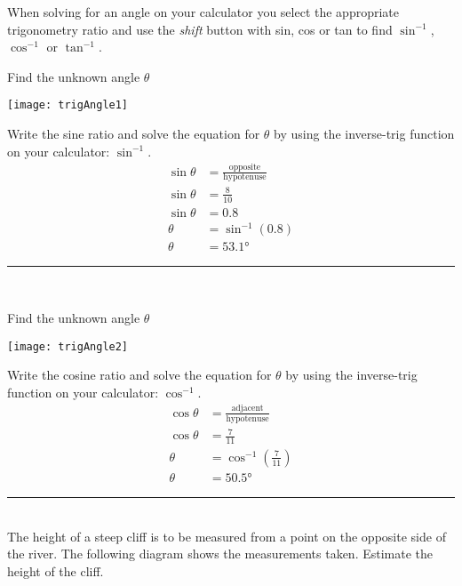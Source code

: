 When solving for an angle on your calculator you select the appropriate trigonometry ratio and use the \emph{shift} button with sin, cos or tan to find $\sin ^{ -1}$, $\cos ^{ -1}$ or $\tan ^{ -1}$. 
\begin{multicols}{2}
	\example Find the unknown angle $\theta$\\
	\begin{center}
		\texttt{[image: trigAngle1]}
	\end{center}
	
	\columnbreak
	\solution Write the sine ratio and solve the equation for $\theta$ by using the inverse-trig function on your calculator: $\sin^{-1}$.\\
	\begin{align*}
	\sin\theta &=\frac{\text{opposite}}{\text{hypotenuse}}\\
	\sin \theta &= \frac{8}{10}\\
	\sin\theta&=0.8\\
	\theta&=\sin^{-1}(0.8)\\
	\theta&=\ang{53.1}
	\end{align*}
\end{multicols}\vspace{-0.5cm}
\rule{6.8cm}{0.5pt}\\
\begin{multicols}{2}
	\example Find the unknown angle $\theta$\\
	\begin{center}
		\texttt{[image: trigAngle2]}
	\end{center}
	\columnbreak
	\solution Write the cosine ratio and solve the equation for $\theta$ by using the inverse-trig function on your calculator: $\cos^{-1}$.
	\begin{align*}
	\cos\theta &=\frac{\text{adjacent}}{\text{hypotenuse}}\\
	\cos \theta &= \frac{7}{11}\\
	\theta&=\cos^{-1} \left(\frac{7}{11}\right)\\
	\theta&=\ang{50.5}
	\end{align*}
\end{multicols}\vspace{-0.5cm}
\rule{6.8cm}{0.5pt}\\
\example The height of a steep cliff is to be measured from a point on the opposite side of the river. The following diagram shows the measurements taken. Estimate the height of the cliff.
